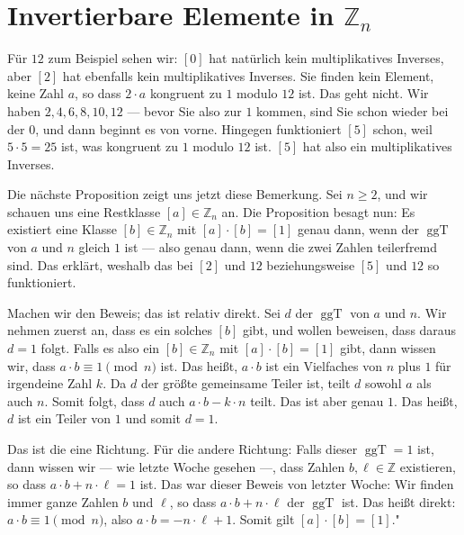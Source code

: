 \section{Invertierbare Elemente in \texorpdfstring{$\mathbb{Z}_n$}{Zn}}

\begin{spoken-clean}[00:29:03 - 00:30:44]
Für $12$ zum Beispiel sehen wir: $[0]$ hat natürlich kein multiplikatives Inverses, aber $[2]$ hat ebenfalls kein multiplikatives Inverses. Sie finden kein Element, keine Zahl $a$, so dass $2 \cdot a$ kongruent zu $1$ modulo $12$ ist. Das geht nicht. Wir haben $2, 4, 6, 8, 10, 12$ --- bevor Sie also zur $1$ kommen, sind Sie schon wieder bei der $0$, und dann beginnt es von vorne. Hingegen funktioniert $[5]$ schon, weil $5 \cdot 5 = 25$ ist, was kongruent zu $1$ modulo $12$ ist. $[5]$ hat also ein multiplikatives Inverses.

Die nächste Proposition zeigt uns jetzt diese Bemerkung. Sei $n \ge 2$, und wir schauen uns eine Restklasse $[a] \in \mathbb{Z}_n$ an. Die Proposition besagt nun: Es existiert eine Klasse $[b] \in \mathbb{Z}_n$ mit $[a] \cdot [b] = [1]$ genau dann, wenn der $\operatorname{ggT}$ von $a$ und $n$ gleich $1$ ist --- also genau dann, wenn die zwei Zahlen teilerfremd sind. Das erklärt, weshalb das bei $[2]$ und $12$ beziehungsweise $[5]$ und $12$ so funktioniert.

Machen wir den Beweis; das ist relativ direkt. Sei $d$ der $\operatorname{ggT}$ von $a$ und $n$. Wir nehmen zuerst an, dass es ein solches $[b]$ gibt, und wollen beweisen, dass daraus $d = 1$ folgt. Falls es also ein $[b] \in \mathbb{Z}_n$ mit $[a] \cdot [b] = [1]$ gibt, dann wissen wir, dass $a \cdot b \equiv 1 \pmod n$ ist. Das heißt, $a \cdot b$ ist ein Vielfaches von $n$ plus $1$ für irgendeine Zahl $k$. Da $d$ der größte gemeinsame Teiler ist, teilt $d$ sowohl $a$ als auch $n$. Somit folgt, dass $d$ auch $a \cdot b - k \cdot n$ teilt. Das ist aber genau $1$. Das heißt, $d$ ist ein Teiler von $1$ und somit $d = 1$.

Das ist die eine Richtung. Für die andere Richtung: Falls dieser $\operatorname{ggT} = 1$ ist, dann wissen wir --- wie letzte Woche gesehen ---, dass Zahlen $b, \ell \in \mathbb{Z}$ existieren, so dass $a \cdot b + n \cdot \ell = 1$ ist. Das war dieser Beweis von letzter Woche: Wir finden immer ganze Zahlen $b$ und $\ell$, so dass $a \cdot b + n \cdot \ell$ der $\operatorname{ggT}$ ist. Das heißt direkt: $a \cdot b \equiv 1 \pmod n$, also $a \cdot b = -n \cdot \ell + 1$. Somit gilt $[a] \cdot [b] = [1]$."
\end{spoken-clean}

